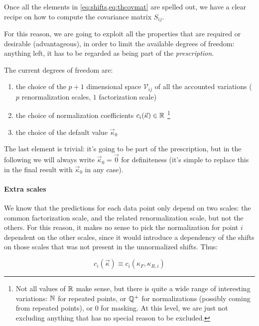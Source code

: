 Once all the elements in \cref{eq:shifts,eq:thcovmat} are spelled out, we have a clear
recipe on how to compute the covariance matrix $S_{ij}$.

For this reason, we are going to exploit all the properties that are required
or desirable (advantageous), in order to limit the available degrees of
freedom: anything left, it has to be regarded as being part of the
\textit{prescription}.

The current degrees of freedom are:

\begin{enumerate}
    \item the choice of the $p + 1$ dimensional space $\mathcal{V}_{ij}$ of all
        the accounted variations ($p$ renormalization scales, $1$ factorization
        scale)
    \item the choice of normalization coefficients $c_i(\vec{\kappa}) \in \mathbb{R}$
        \footnote{
            Not all values of $\mathbb{R}$ make sense, but there is quite a wide range
            of interesting variations: $\mathbb{N}$ for repeated points, or $\mathbb{Q}^+$ for
            normalizations (possibly coming from repeated points), or $0$ for
            masking.
            At this level, we are just not excluding anything that has no
            special reason to be excluded.
        }
    \item the choice of the default value $\vec{\kappa}_0$
\end{enumerate}

The last element is trivial: it's going to be part of the prescription, but in
the following we will always write $\vec{\kappa}_0 = \vec{0}$ for definiteness
(it's simple to replace this in the final result with $\vec{\kappa}_0$ in any
case).

\paragraph{Extra scales} We know that the predictions for each data point only
depend on two scales: the common factorization scale, and the related
renormalization scale, but not the others.
For this reason, it makes no sense to pick the normalization for point $i$
dependent on the other scales, since it would introduce a dependency of the
shifts on those scales that was not present in the unnormalized shifts.
Thus:

\begin{equation}
    \label{eq:mhou/prescr/2dim-norm}
    c_i(\vec{\kappa}) \equiv c_i(\kappa_F, \kappa_{R,i})
\end{equation}

